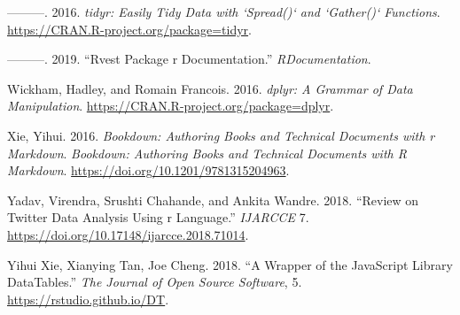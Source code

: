 \documentclass[preprint, 3p,
authoryear]{elsarticle} %
\newlength{\cslhangindent}
\newlength{\cslentryspacingunit} %
\newenvironment{CSLReferences}[2] %
 {%
  \setlength{\parindent}{0pt}
  \ifodd #1
  \let\oldpar\par
  \def\par{\hangindent=\cslhangindent\oldpar}
  \fi
  \setlength{\parskip}{#2\cslentryspacingunit}
 }%
 {}
\begin{document}
\begin{CSLReferences}{1}{0}
\leavevmode{}%
---------. 2016. \emph{{tidyr}: Easily Tidy Data with `Spread()` and
`Gather()` Functions}. \url{https://CRAN.R-project.org/package=tidyr}.

\leavevmode{}%
---------. 2019. {``Rvest Package \textbar{} r Documentation.''}
\emph{RDocumentation}.

\leavevmode{}%
Wickham, Hadley, and Romain Francois. 2016. \emph{{dplyr}: A Grammar of
Data Manipulation}. \url{https://CRAN.R-project.org/package=dplyr}.

\leavevmode{}%
Xie, Yihui. 2016. \emph{Bookdown: Authoring Books and Technical
Documents with r Markdown}. \emph{Bookdown: Authoring Books and
Technical Documents with R Markdown}.
\url{https://doi.org/10.1201/9781315204963}.

\leavevmode{}%
Yadav, Virendra, Srushti Chahande, and Ankita Wandre. 2018. {``Review on
Twitter Data Analysis Using r Language.''} \emph{IJARCCE} 7.
\url{https://doi.org/10.17148/ijarcce.2018.71014}.

\leavevmode{}%
Yihui Xie, Xianying Tan, Joe Cheng. 2018. {``A Wrapper of the JavaScript
Library DataTables.''} \emph{The Journal of Open Source Software}, 5.
\url{https://rstudio.github.io/DT}.

\end{CSLReferences}
\end{document}
